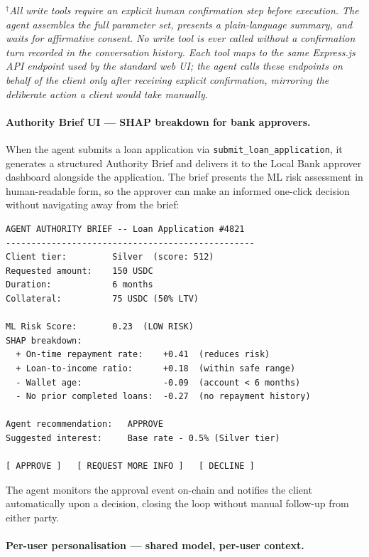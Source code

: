 \documentclass[12pt,a4paper]{report}
\begin{document}
\begin{table}[H]
\vspace{4pt}
\noindent\small$^{\dagger}$\textit{All write tools require an explicit human confirmation step before execution. The agent assembles the full parameter set, presents a plain-language summary, and waits for affirmative consent. No write tool is ever called without a confirmation turn recorded in the conversation history. Each tool maps to the same Express.js API endpoint used by the standard web UI; the agent calls these endpoints on behalf of the client only after receiving explicit confirmation, mirroring the deliberate action a client would take manually.}
\end{table}

\paragraph{Authority Brief UI --- SHAP breakdown for bank approvers.}

When the agent submits a loan application via \texttt{submit\_loan\_application}, it generates a structured Authority Brief and delivers it to the Local Bank approver dashboard alongside the application. The brief presents the ML risk assessment in human-readable form, so the approver can make an informed one-click decision without navigating away from the brief:

\begin{verbatim}
AGENT AUTHORITY BRIEF -- Loan Application #4821
-------------------------------------------------
Client tier:         Silver  (score: 512)
Requested amount:    150 USDC
Duration:            6 months
Collateral:          75 USDC (50% LTV)

ML Risk Score:       0.23  (LOW RISK)
SHAP breakdown:
  + On-time repayment rate:    +0.41  (reduces risk)
  + Loan-to-income ratio:      +0.18  (within safe range)
  - Wallet age:                -0.09  (account < 6 months)
  - No prior completed loans:  -0.27  (no repayment history)

Agent recommendation:   APPROVE
Suggested interest:     Base rate - 0.5% (Silver tier)

[ APPROVE ]   [ REQUEST MORE INFO ]   [ DECLINE ]
\end{verbatim}

\noindent The agent monitors the approval event on-chain and notifies the client automatically upon a decision, closing the loop without manual follow-up from either party.

\paragraph{Per-user personalisation --- shared model, per-user context.}
\end{document}
